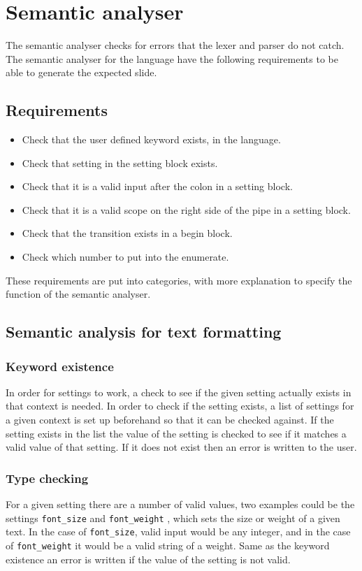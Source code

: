 \chapter{Semantic analyser}

The semantic analyser checks for errors that the lexer and parser do not catch. The semantic analyser for the language have the following requirements to be able to generate the expected slide.

\section{Requirements}
\begin{itemize}
	\item Check that the user defined keyword exists, in the language.
	\item Check that setting in the setting block exists.
	\item Check that it is a valid input after the colon in a setting block.
	\item Check that it is a valid scope on the right side of the pipe in a setting block.
	\item Check that the transition exists in a begin block.
	\item Check which number to put into the enumerate.
\end{itemize}

These requirements are put into categories, with more explanation to specify the function of the semantic analyser.

\section{Semantic analysis for text formatting}

    \subsection{Keyword existence}
In order for settings to work, a check to see if the given setting actually exists in that context is needed. In order to check if the setting exists, a list of settings for a given context is set up beforehand so that it can be checked against. If the setting exists in the list the value of the setting is checked to see if it matches a valid value of that setting. If it does not exist then an error is written to the user.

    \subsection{Type checking}
For a given setting there are a number of valid values, two examples could be the settings \texttt{font\_size} and \texttt{font\_weight} , which sets the size or weight of a given text. In the case of \texttt{font\_size}, valid input would be any integer, and in the case of \texttt{font\_weight} it would be a valid string of a weight. Same as the keyword existence an error is written if the value of the setting is not valid.

